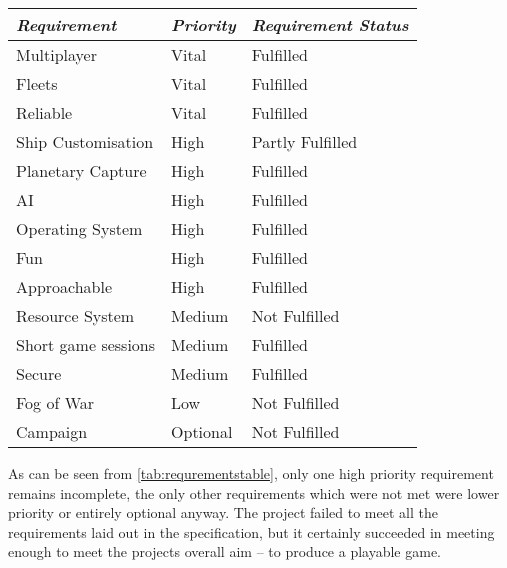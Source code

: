 \begin{table*}[ht]
	\begin{tabular}{p{10em} p{6em} p{12em}}
		\toprule
		\emph{Requirement} & \emph{Priority} & \emph{Requirement Status}\\
		\midrule
   Multiplayer & Vital & Fulfilled\\
	Fleets & Vital &  Fulfilled \\
	Reliable & Vital & Fulfilled\\
	
	Ship Customisation & High & Partly Fulfilled\\
   Planetary Capture & High & Fulfilled \\
   AI & High & Fulfilled \\
	
   Operating System & High & Fulfilled\\
	Fun & High & Fulfilled\\
	Approachable & High & Fulfilled\\
	Resource System & Medium & Not Fulfilled \\
	Short game sessions & Medium & Fulfilled\\
   Secure & Medium & Fulfilled\\
	Fog of War & Low & Not Fulfilled \\
	Campaign & Optional & Not Fulfilled\\

	\bottomrule
	\end{tabular}
	\caption{Requirement fulfillment}
	\label{tab:requrementstable}
\end{table*}

\vspace{5mm}

As can be seen from \ref{tab:requrementstable}, only one high priority requirement remains incomplete, the only other requirements which were not met were lower priority or entirely optional anyway. The project failed to meet all the requirements laid out in the specification, but it certainly succeeded in meeting enough to meet the projects overall aim -- to produce a playable game.
